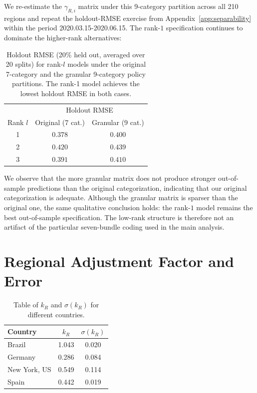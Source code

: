 \documentclass[msom,blindrev]{informs3} %
\newcommand{\rev}[1]{{\color{blue}#1}}
\begin{document}
\begin{APPENDICES}
{We re-estimate the $\gamma_{R,i}$ matrix under this 9-category partition across all 210 regions and repeat the holdout-RMSE exercise from Appendix~\ref{app:separability} within the period 2020.03.15-2020.06.15. The rank-$1$ specification continues to dominate the higher-rank alternatives:

\begin{table}[htbp!]
    \centering
    {\color{blue}
    \begin{tabular}{|c|cc|}
    \hline
    & \multicolumn{2}{c|}{Holdout RMSE} \\
    Rank $l$ & Original (7 cat.) & Granular (9 cat.) \\\hline
    1 & $0.378$ & $0.400$ \\
    2 & $0.420$ & $0.439$ \\
    3 & $0.391$ & $0.410$ \\\hline
    \end{tabular}
    }
    \caption{\rev{Holdout RMSE (20\% held out, averaged over 20 splits) for rank-$l$ models under the original 7-category and the granular 9-category policy partitions. The rank-1 model achieves the lowest holdout RMSE in both cases.}}
    \label{tab:granular_rmse}
    \end{table}

    We observe that the more granular matrix does not produce stronger out-of-sample predictions than the original categorization, indicating that our original categorization is adequate. Although the granular matrix is sparser than the original one, the same qualitative conclusion holds: the rank-$1$ model remains the best out-of-sample specification. The low-rank structure is therefore not an artifact of the particular seven-bundle coding used in the main analysis.
}
\section{\rev{Regional Adjustment Factor and Error}}
\label{app:adjustment_factor}
 \begin{table}[H]
\centering
{\color{blue}\begin{tabular}{|l|c|c|}
\hline
\textbf{Country} & $k_R$ & $\sigma(k_R)$ \\ \hline
Brazil  & 1.043 & 0.020 \\ \hline
Germany & 0.286 & 0.084 \\ \hline
New York, US & 0.549 & 0.114 \\ \hline
Spain      & 0.442 & 0.019 \\ \hline
\end{tabular}
}
\caption{Table of $k_R$ and $\sigma(k_R)$ for different countries.}
\label{tab:kr_values}
\end{table}



\end{APPENDICES}
\end{document}
